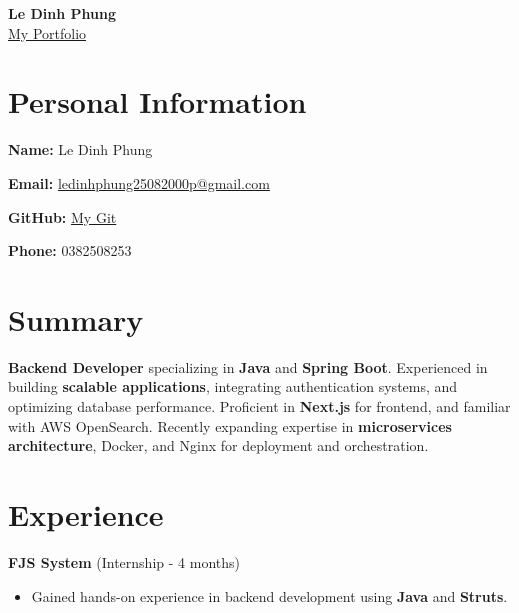 \documentclass[11pt,a4paper]{article}
\begin{document}
\begin{center}
    {\Huge\bfseries\color{maincolor} Le Dinh Phung} \\[0.5em]
    \href{https://phung-portfolio-nvim.vercel.app}{My Portfolio}

\end{center}

\vspace{1em}

\section{Personal Information}
\begin{adjustwidth}{2em}{}
\textbf{Name:} Le Dinh Phung

\textbf{Email:} \href{mailto:ledinhphung25082000p@gmail.com}{ledinhphung25082000p@gmail.com}

\textbf{GitHub:} \href{https://github.com/shegga9x}{My Git}

\textbf{Phone:} 0382508253
\end{adjustwidth}

\section{Summary}
\begin{adjustwidth}{2em}{}
\textbf{Backend Developer} specializing in \textbf{Java} and \textbf{Spring Boot}. Experienced in building \textbf{scalable applications}, integrating authentication systems, and optimizing database performance. Proficient in \textbf{Next.js} for frontend, and familiar with AWS OpenSearch. Recently expanding expertise in \textbf{microservices architecture}, Docker, and Nginx for deployment and orchestration.
\end{adjustwidth}

\section{Experience}
\begin{adjustwidth}{2em}{}
\textbf{FJS System} (Internship - 4 months)
\begin{itemize}[leftmargin=*]
    \item Gained hands-on experience in backend development using \textbf{Java} and \textbf{Struts}.
\end{itemize}
\end{adjustwidth}
\end{document}
